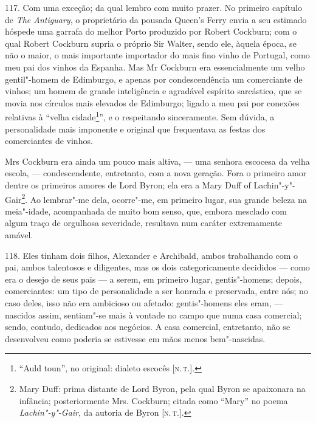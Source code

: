 117. Com uma exceção; da qual lembro com muito prazer. No primeiro
capítulo de \emph{The Antiguary}, o proprietário da pousada Queen's
Ferry envia a seu estimado hóspede uma garrafa do melhor Porto produzido
por Robert Cockburn; com o qual Robert Cockburn supria o próprio Sir
Walter, sendo ele, àquela época, se não o maior, o mais importante
importador do mais fino vinho de Portugal, como meu pai dos vinhos da
Espanha. Mas Mr Cockburn era essencialmente um velho gentil"-homem de
Edimburgo, e apenas por condescendência um comerciante de vinhos; um
homem de grande inteligência e agradável espírito sarcástico, que se
movia nos círculos mais elevados de Edimburgo; ligado a meu pai por
conexões relativas à ``velha cidade\footnote{``Auld toun'', no original:
  dialeto escocês {[}\textsc{n.\,t.}{]}.}'', e o respeitando sinceramente. Sem
dúvida, a personalidade mais imponente e original que frequentava as
festas dos comerciantes de vinhos.

Mrs Cockburn era ainda um pouco mais altiva, --- uma senhora escocesa da
velha escola, --- condescendente, entretanto, com a nova geração. Fora o
primeiro amor dentre os primeiros amores de Lord Byron; ela era a Mary
Duff of Lachin"-y"-Gair\footnote{Mary Duff: prima distante de Lord Byron,
  pela qual Byron se apaixonara na infância; posteriormente Mrs.
  Cockburn; citada como ``Mary'' no poema \emph{Lachin"-y"-Gair}, da
  autoria de Byron {[}\textsc{n.\,t.}{]}.}. Ao lembrar"-me dela, ocorre"-me, em
primeiro lugar, sua grande beleza na meia"-idade, acompanhada de muito
bom senso, que, embora mesclado com algum traço de orgulhosa severidade,
resultava num caráter extremamente amável.

118. Eles tinham dois filhos, Alexander e Archibald, ambos trabalhando
com o pai, ambos talentosos e diligentes, mas os dois categoricamente
decididos --- como era o desejo de seus pais --- a serem, em primeiro
lugar, gentis"-homens; depois, comerciantes: um tipo de personalidade a
ser honrada e preservada, entre nós; no caso deles, isso não era
ambicioso ou afetado: gentis"-homens eles eram, --- nascidos assim,
sentiam"-se mais à vontade no campo que numa casa comercial; sendo,
contudo, dedicados aos negócios. A casa comercial, entretanto, não se
desenvolveu como poderia se estivesse em mãos menos bem"-nascidas.

